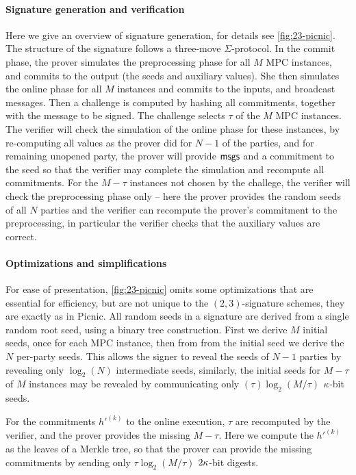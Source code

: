 \paragraph{Signature generation and verification} Here we give an overview of
signature generation, for details see \cref{fig:23-picnic}. The structure of
the signature follows a three-move $\Sigma$-protocol. In the commit phase, the
prover simulates the preprocessing phase for all $M$ MPC instances, and commits
to the output (the seeds and auxiliary values).  She then simulates the online
phase for all $M$ instances and commits to the inputs, and broadcast messages.
Then a challenge is computed by hashing all commitments, together with the
message to be signed.  The challenge selects $\tau$ of the $M$ MPC instances.
The verifier will check the simulation of the online phase for these instances,
by re-computing all values as the prover did for $N-1$ of the parties, and for
remaining unopened party, the prover will provide $\textsf{msgs}$ and a commitment to
the seed so that the verifier may complete the simulation and recompute all
commitments. 
For the $M-\tau$ instances not chosen by the challege, the verifier will check
the preprocessing phase only -- here the prover provides the random seeds of
all $N$ parties and the verifier can recompute the prover's commitment to the
preprocessing, in particular the verifier checks that the auxiliary values are
correct.

\paragraph{Optimizations and simplifications}
For ease of presentation, \cref{fig:23-picnic} omits some optimizations that
are essential for efficiency, but are not unique to the $(2,3)$-signature schemes, 
they are exactly as in Picnic. All random seeds in a signature are derived from
a single random root seed, using a binary tree construction. First we derive
$M$ initial seeds, once for each MPC instance, then from from the initial seed
we derive the $N$ per-party seeds. This allows the signer to reveal the seeds
of $N-1$ parties by revealing only $\log_2(N)$ intermediate seeds, similarly, 
the initial seeds for $M-\tau$ of $M$ instances may be revealed by communicating
only $(\tau)\log_2(M/\tau)$ $\kappa$-bit seeds.

For the commitments $h'^{(k)}$ to the online execution, $\tau$ are recomputed
by the verifier, and the prover provides the missing $M-\tau$.  Here we compute
the $h'^{(k)}$ as the leaves of a Merkle tree,  so that the prover can provide
the missing commitments by sending only $\tau\log_2(M/\tau)$ $2\kappa$-bit
digests. 

